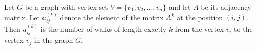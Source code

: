 \begin{thm}
Let $G$ be a graph with vertex set $V = \{v_1, v_2, \ldots, v_n\}$ and let $A$ be its adjacency matrix.
Let $a^{(k)}_{ij}$ denote the element of the matrix $A^k$ at the position $(i,j)$.
Then $a^{(k)}_{ij}$ is the number of walks of length exactly $k$ from the vertex $v_i$ to the vertex $v_j$ in the graph $G$.
\end{thm}